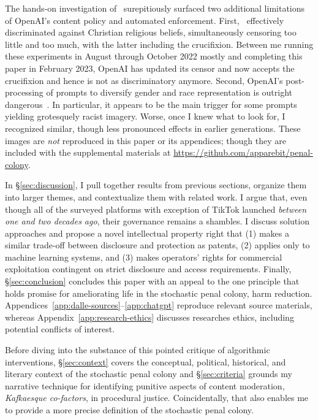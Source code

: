 The hands-on investigation of \DALLE\ surepitiously surfaced two additional
limitations of OpenAI's content policy and automated enforcement. First, \DALLE\
effectively discriminated against Christian religious beliefs, simultaneously
censoring too little and too much, with the latter including the crucifixion.
Between me running these experiments in August through October 2022 mostly and
completing this paper in February 2023, OpenAI has updated its censor and now
accepts the crucifixion and hence is not as discriminatory anymore. Second,
OpenAI's post-processing of prompts to diversify gender and race representation
is outright dangerous~\cite{OpenAI2022e,Sparkes2022}. In particular, it appears
to be the main trigger for some prompts yielding grotesquely racist imagery.
Worse, once I knew what to look for, I recognized similar, though less
pronounced effects in earlier generations. These images are \emph{not}
reproduced in this paper or its appendices; though they are included with the
supplemental materials at \url{https://github.com/apparebit/penal-colony}.

In \S\ref{sec:discussion}, I pull together results from previous sections,
organize them into larger themes, and contextualize them with related work. I
argue that, even though all of the surveyed platforms with exception of TikTok
launched \emph{between one and two decades ago}, their governance remains a
shambles. I discuss solution approaches and propose a novel intellectual
property right that (1) makes a similar trade-off between disclosure and
protection as patents, (2) applies only to machine learning systems, and (3)
makes operators' rights for commercial exploitation contingent on strict
disclosure and access requirements. Finally, \S\ref{sec:conclusion} concludes
this paper with an appeal to the one principle that holds promise for
ameliorating life in the stochastic penal colony, harm reduction.
Appendices~\ref{app:dalle-sources}--\ref{app:chatgpt} reproduce relevant source
materials, whereas Appendix~\ref{app:research-ethics} discusses researches
ethics, including potential conflicts of interest.

Before diving into the substance of this pointed critique of algorithmic
interventions, \S\ref{sec:context} covers the conceptual, political, historical,
and literary context of the stochastic penal colony and \S\ref{sec:criteria}
grounds my narrative technique for identifying punitive aspects of content
moderation, \emph{Kafkaesque co-factors}, in procedural justice. Coincidentally,
that also enables me to provide a more precise definition of the stochastic
penal colony.


